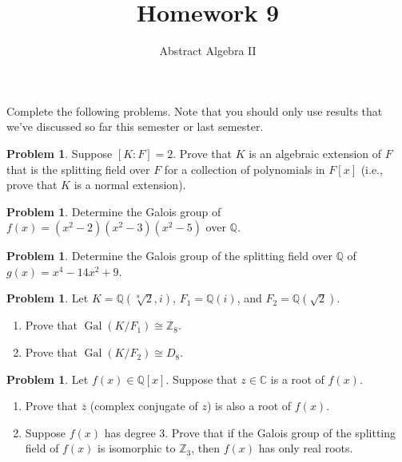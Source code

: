\documentclass[11pt]{scrartcl}
\theoremstyle{definition}
\newtheorem{problem}[theorem]{Problem}
\DeclareMathOperator{\Gal}{Gal}
\begin{document}
\title{Homework 9}
\subtitle{Abstract Algebra II}
\date{}

\maketitle
\thispagestyle{fancy}

Complete the following problems. Note that you should only use results that we've discussed so far this semester or last semester.

\begin{problem}
Suppose $[K:F]=2$. Prove that $K$ is an algebraic extension of $F$ that is the splitting field over $F$ for a collection of polynomials in $F[x]$ (i.e., prove that $K$ is a normal extension).
\end{problem}

\begin{problem}
Determine the Galois group of $f(x)=(x^2-2)(x^2-3)(x^2-5)$ over $\mathbb{Q}$.
\end{problem}

\begin{problem}
Determine the Galois group of the splitting field over $\mathbb{Q}$ of $g(x)=x^4-14x^2+9$.
\end{problem}

\begin{problem}
Let $K=\mathbb{Q}(\sqrt[8]{2},i)$, $F_1=\mathbb{Q}(i)$, and $F_2=\mathbb{Q}(\sqrt{2})$.
\begin{enumerate}[label=\rm{(\alph*)}]
\item Prove that $\Gal(K/F_1)\cong \mathbb{Z}_8$.
\item Prove that $\Gal(K/F_2)\cong D_8$.
\end{enumerate}
\end{problem}

\begin{problem}
Let $f(x) \in \mathbb{Q}[x]$. Suppose that $z\in\mathbb{C}$ is a root of $f(x)$. 
\begin{enumerate}[label=\rm{(\alph*)}]
\item Prove that $\overline{z}$ (complex conjugate of $z$) is also a root of $f(x)$.
\item Suppose $f(x)$ has degree 3. Prove that if the Galois group of the splitting field of $f(x)$ is isomorphic to $\mathbb{Z}_3$, then $f(x)$ has only real roots.
\end{enumerate}
\end{problem}
\end{document}
